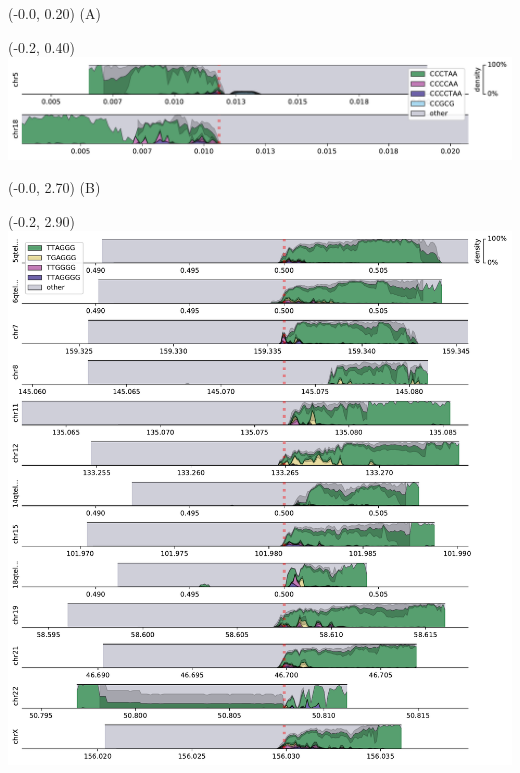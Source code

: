\documentclass{article}
\begin{document}
\begin{textblock}{13}(-0.0,  0.20) \LARGE{(A)} \end{textblock}
\begin{textblock}{13}(-0.2,  0.40) \includegraphics{assets/HG005-densityplot-p_arm.pdf}   \end{textblock}

\begin{textblock}{13}(-0.0,  2.70) \LARGE{(B)} \end{textblock}
\begin{textblock}{13}(-0.2,  2.90) \includegraphics{assets/HG005-densityplot-q_arm.pdf}   \end{textblock}
\end{document}
